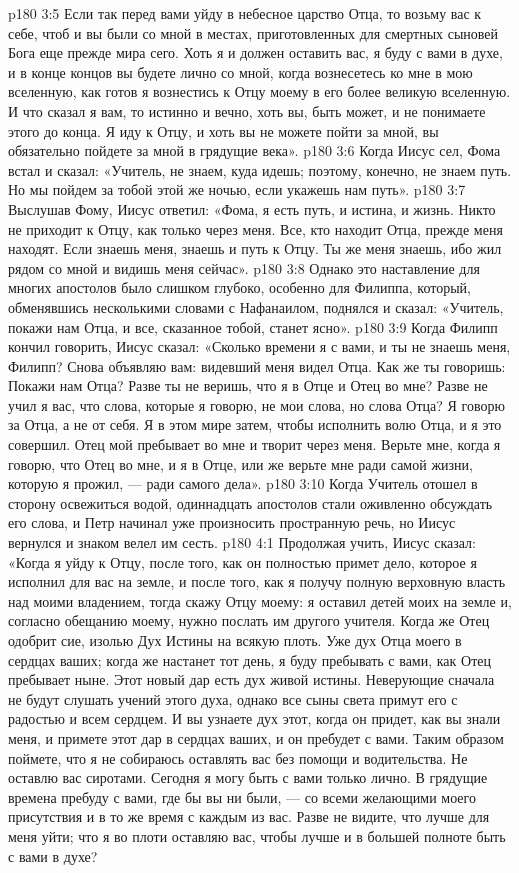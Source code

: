 \vs p180 3:5 Если так перед вами уйду в небесное царство Отца, то возьму вас к себе, чтоб и вы были со мной в местах, приготовленных для смертных сыновей Бога еще прежде мира сего. Хоть я и должен оставить вас, я буду с вами в духе, и в конце концов вы будете лично со мной, когда вознесетесь ко мне в мою вселенную, как готов я вознестись к Отцу моему в его более великую вселенную. И что сказал я вам, то истинно и вечно, хоть вы, быть может, и не понимаете этого до конца. Я иду к Отцу, и хоть вы не можете пойти за мной, вы обязательно пойдете за мной в грядущие века».
\vs p180 3:6 Когда Иисус сел, Фома встал и сказал: «Учитель, не знаем, куда идешь; поэтому, конечно, не знаем путь. Но мы пойдем за тобой этой же ночью, если укажешь нам путь».
\vs p180 3:7 Выслушав Фому, Иисус ответил: «Фома, я есть путь, и истина, и жизнь. Никто не приходит к Отцу, как только через меня. Все, кто находит Отца, прежде меня находят. Если знаешь меня, знаешь и путь к Отцу. Ты же меня знаешь, ибо жил рядом со мной и видишь меня сейчас».
\vs p180 3:8 Однако это наставление для многих апостолов было слишком глубоко, особенно для Филиппа, который, обменявшись несколькими словами с Нафанаилом, поднялся и сказал: «Учитель, покажи нам Отца, и все, сказанное тобой, станет ясно».
\vs p180 3:9 Когда Филипп кончил говорить, Иисус сказал: «Сколько времени я с вами, и ты не знаешь меня, Филипп? Снова объявляю вам: видевший меня видел Отца. Как же ты говоришь: Покажи нам Отца? Разве ты не веришь, что я в Отце и Отец во мне? Разве не учил я вас, что слова, которые я говорю, не мои слова, но слова Отца? Я говорю за Отца, а не от себя. Я в этом мире затем, чтобы исполнить волю Отца, и я это совершил. Отец мой пребывает во мне и творит через меня. Верьте мне, когда я говорю, что Отец во мне, и я в Отце, или же верьте мне ради самой жизни, которую я прожил, --- ради самого дела».
\vs p180 3:10 Когда Учитель отошел в сторону освежиться водой, одиннадцать апостолов стали оживленно обсуждать его слова, и Петр начинал уже произносить пространную речь, но Иисус вернулся и знаком велел им сесть.
\vs p180 4:1 Продолжая учить, Иисус сказал: «Когда я уйду к Отцу, после того, как он полностью примет дело, которое я исполнил для вас на земле, и после того, как я получу полную верховную власть над моими владением, тогда скажу Отцу моему: я оставил детей моих на земле и, согласно обещанию моему, нужно послать им другого учителя. Когда же Отец одобрит сие, изолью Дух Истины на всякую плоть. Уже дух Отца моего в сердцах ваших; когда же настанет тот день, я буду пребывать с вами, как Отец пребывает ныне. Этот новый дар есть дух живой истины. Неверующие сначала не будут слушать учений этого духа, однако все сыны света примут его с радостью и всем сердцем. И вы узнаете дух этот, когда он придет, как вы знали меня, и примете этот дар в сердцах ваших, и он пребудет с вами. Таким образом поймете, что я не собираюсь оставлять вас без помощи и водительства. Не оставлю вас сиротами. Сегодня я могу быть с вами только лично. В грядущие времена пребуду с вами, где бы вы ни были, --- со всеми желающими моего присутствия и в то же время с каждым из вас. Разве не видите, что лучше для меня уйти; что я во плоти оставляю вас, чтобы лучше и в большей полноте быть с вами в духе?

